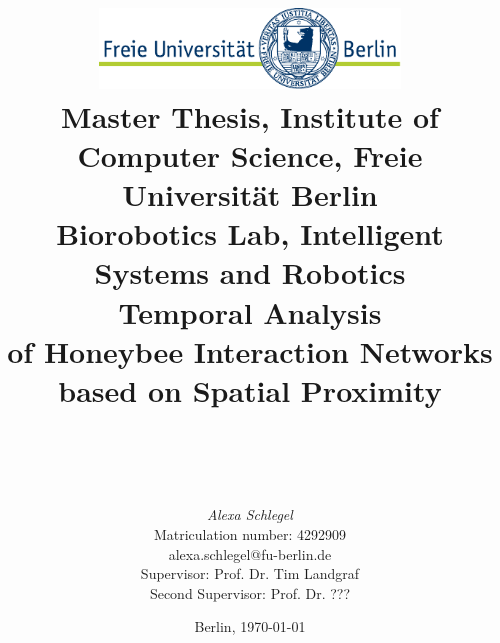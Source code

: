%
\begin{titlepage}

\title{\includegraphics[width=0.6\textwidth]{Resources/FU_logo.pdf}\\
{\small Master Thesis, Institute of Computer Science, Freie Universität Berlin}\\
{\small Biorobotics Lab, Intelligent Systems and Robotics}\\
[6ex]
{\LARGE Temporal Analysis\\ of Honeybee Interaction Networks\\}
{\normalsize based on Spatial Proximity\\ }
\vspace{2ex}
\\
}

\author{
{\emph{\normalsize Alexa Schlegel}}\\
{\normalsize Matriculation number: 4292909}\\
{\normalsize alexa.schlegel@fu-berlin.de}\\ 
[15ex]   
{\normalsize Supervisor: Prof. Dr. Tim Landgraf}\\
{\normalsize Second Supervisor: Prof. Dr. ???}\\
}
\vspace{6ex}
\date{\normalsize Berlin, \today}
 
\maketitle  


\end{titlepage}